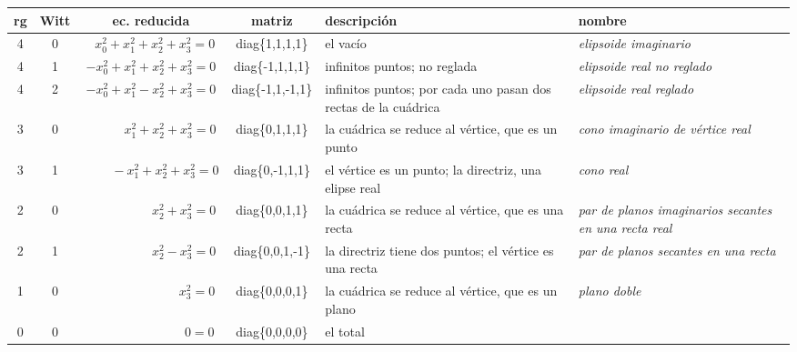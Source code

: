 \documentclass[12pt]{report}
\theoremstyle{definition}
\theoremstyle{definition}
\theoremstyle{remark}
\begin{document}
\begin{center}
\begin{tabular}{|c|c|c|c|m{2.75cm}|m{4cm}|}
    \hline
     \textbf{rg} & \textbf{Witt} & \textbf{ec. reducida} & \textbf{matriz} & \centering \textbf{descripción} & \centering \textbf{nombre} \tabularnewline
     \hline
     4 & 0 & $\ \ \, x_0^2+x_1^2+x_2^2+x_3^2=0$ & diag\{1,1,1,1\} & \scriptsize el vacío & \textit{elipsoide imaginario} \\
     \hline
     4 & 1 & $-x_0^2+x_1^2+x_2^2+x_3^2=0$ & diag\{-1,1,1,1\} & \scriptsize infinitos puntos; no reglada & \textit{elipsoide real no reglado} \\
     \hline
     4 & 2 & $-x_0^2+x_1^2-x_2^2+x_3^2=0$ & diag\{-1,1,-1,1\} & \scriptsize infinitos puntos; por cada uno pasan dos rectas de la cuádrica & \textit{elipsoide real reglado} \\
     \hline
     3 & 0 & $\qquad \quad x_1^2+x_2^2+x_3^2=0$ & diag\{0,1,1,1\} & \scriptsize la cuádrica se reduce al vértice, que es un punto & \textit{cono imaginario de vértice real} \\
     \hline
     3 & 1 & $\qquad \: -x_1^2+x_2^2+x_3^2=0$ & diag\{0,-1,1,1\} & \scriptsize el vértice es un punto; la directriz, una elipse real & \textit{cono real} \\
     \hline
     2 & 0 & $\qquad \qquad \quad \, x_2^2+x_3^2=0$ & diag\{0,0,1,1\} & \scriptsize la cuádrica se reduce al vértice, que es una recta & \textit{par de planos imaginarios secantes en una recta real} \\
     \hline
     2 & 1 & $\qquad \qquad \quad \, x_2^2-x_3^2=0$ & diag\{0,0,1,-1\} & \scriptsize la directriz tiene dos puntos; el vértice es una recta & \textit{par de planos secantes en una recta} \\
     \hline
     1 & 0 & $\qquad \qquad \qquad \quad \ x_3^2=0$ & diag\{0,0,0,1\} & \scriptsize la cuádrica se reduce al vértice, que es un plano & \textit{plano doble} \\
     \hline
     0 & 0 & $\qquad \qquad \qquad \quad \ \ \, 0=0$ & diag\{0,0,0,0\} & \scriptsize el total & \\
     \hline
\end{tabular}

\pagebreak

\normalsize

\end{center}
\end{document}
